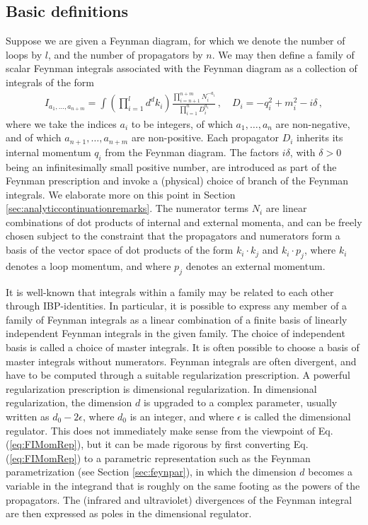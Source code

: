 \documentclass{article}
\begin{document}
\subsection{Basic definitions}
\label{sec:fimain}
Suppose we are given a Feynman diagram, for which we denote the number of loops by $l$, and the number of propagators by $n$. We may then define a family of scalar Feynman integrals associated with the Feynman diagram as a collection of integrals of the form
\begin{align}
    \label{eq:FIMomRep}
    I_{a_1,\ldots,a_{n+m}} = \int\left(\prod_{i=1}^{l} d^{d} k_{i}\right) \frac{\prod_{i=n+1}^{n+m} N_i^{-a_i}}{\prod_{i=1}^n D_{i}^{a_i}}\,,\quad D_i = -q_{i}^2 + m_{i}^2 -i\delta\,,
\end{align}
where we take the indices $a_i$ to be integers, of which $a_1,\ldots,a_n$ are non-negative, and of which $a_{n+1},\ldots,a_{n+m}$ are non-positive. Each propagator $D_i$ inherits its internal momentum $q_i$ from the Feynman diagram. The factors $i\delta$, with $\delta>0$ being an infinitesimally small positive number, are introduced as part of the Feynman prescription and invoke a (physical) choice of branch of the Feynman integrals. We elaborate more on this point in Section \ref{sec:analyticcontinuationremarks}. The numerator terms $N_i$ are linear combinations of dot products of internal and external momenta, and can be freely chosen subject to the constraint that the propagators and numerators form a basis of the vector space of dot products of the form $k_i\cdot k_j$ and $k_i \cdot p_j$, where $k_i$ denotes a loop momentum, and where $p_j$ denotes an external momentum.

It is well-known that integrals within a family may be related to each other through IBP-identities. In particular, it is possible to express any member of a family of Feynman integrals as a linear combination of a finite basis of linearly independent Feynman integrals in the given family. The choice of independent basis is called a choice of master integrals. It is often possible to choose a basis of master integrals without numerators. Feynman integrals are often divergent, and have to be computed through a suitable regularization prescription. A powerful regularization prescription is dimensional regularization. In dimensional regularization, the dimension $d$ is upgraded to a complex parameter, usually written as $d_{0} - 2\epsilon$, where $d_{0}$ is an integer, and where $\epsilon$ is called the dimensional regulator. This does not immediately make sense from the viewpoint of Eq. (\ref{eq:FIMomRep}), but it can be made rigorous by first converting Eq. (\ref{eq:FIMomRep}) to a parametric representation such as the Feynman parametrization (see Section \ref{sec:feynpar}), in which the dimension $d$ becomes a variable in the integrand that is roughly on the same footing as the powers of the propagators. The (infrared and ultraviolet) divergences of the Feynman integral are then expressed as poles in the dimensional regulator.
\end{document}
